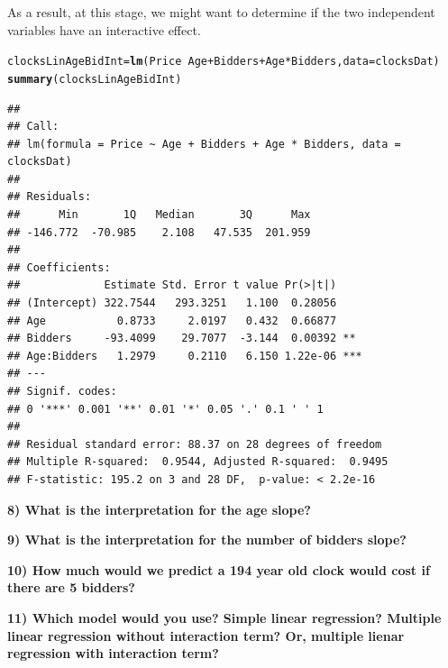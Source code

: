 \documentclass{article}\usepackage[]{graphicx}\usepackage[]{color}
\makeatletter
\newcommand{\hlopt}[1]{\textcolor[rgb]{0,0,0}{#1}}%
\newcommand{\hlstd}[1]{\textcolor[rgb]{0.345,0.345,0.345}{#1}}%
\newcommand{\hlkwb}[1]{\textcolor[rgb]{0.69,0.353,0.396}{#1}}%
\newcommand{\hlkwc}[1]{\textcolor[rgb]{0.333,0.667,0.333}{#1}}%
\newcommand{\hlkwd}[1]{\textcolor[rgb]{0.737,0.353,0.396}{\textbf{#1}}}%
\newenvironment{kframe}{%
 \def\at@end@of@kframe{}%
 \ifinner\ifhmode%
  \def\at@end@of@kframe{\end{minipage}}%
  \begin{minipage}{\columnwidth}%
 \fi\fi%
 \def\FrameCommand##1{\hskip\@totalleftmargin \hskip-\fboxsep
 \colorbox{shadecolor}{##1}\hskip-\fboxsep
     \hskip-\linewidth \hskip-\@totalleftmargin \hskip\columnwidth}%
 \MakeFramed {\advance\hsize-\width
   \@totalleftmargin\z@ \linewidth\hsize
   \@setminipage}}%
 {\par\unskip\endMakeFramed%
 \at@end@of@kframe}
\newenvironment{knitrout}{}{} %
\makeatother
\begin{document}
\vspace{5mm}

\noindent As a result, at this stage, we might want to determine if the two independent variables have an interactive effect.

\begin{knitrout}
\color{fgcolor}\begin{kframe}
\begin{alltt}
\hlstd{clocksLinAgeBidInt} \hlkwb{=} \hlkwd{lm}\hlstd{(Price} \hlopt{~} \hlstd{Age} \hlopt{+} \hlstd{Bidders} \hlopt{+} \hlstd{Age}\hlopt{*}\hlstd{Bidders,} \hlkwc{data}\hlstd{=clocksDat)}
\hlkwd{summary}\hlstd{(clocksLinAgeBidInt)}
\end{alltt}
\begin{verbatim}
## 
## Call:
## lm(formula = Price ~ Age + Bidders + Age * Bidders, data = clocksDat)
## 
## Residuals:
##      Min       1Q   Median       3Q      Max 
## -146.772  -70.985    2.108   47.535  201.959 
## 
## Coefficients:
##             Estimate Std. Error t value Pr(>|t|)    
## (Intercept) 322.7544   293.3251   1.100  0.28056    
## Age           0.8733     2.0197   0.432  0.66877    
## Bidders     -93.4099    29.7077  -3.144  0.00392 ** 
## Age:Bidders   1.2979     0.2110   6.150 1.22e-06 ***
## ---
## Signif. codes:  
## 0 '***' 0.001 '**' 0.01 '*' 0.05 '.' 0.1 ' ' 1
## 
## Residual standard error: 88.37 on 28 degrees of freedom
## Multiple R-squared:  0.9544,	Adjusted R-squared:  0.9495 
## F-statistic: 195.2 on 3 and 28 DF,  p-value: < 2.2e-16
\end{verbatim}
\end{kframe}
\end{knitrout}

\vspace{5mm}

\textbf{8) What is the interpretation for the age slope?}

\vspace{20mm}

\textbf{9) What is the interpretation for the number of bidders slope?}

\vspace{20mm}

\textbf{10) How much would we predict a 194 year old clock would cost if there are 5 bidders?}

\vspace{20mm}

\textbf{11) Which model would you use? Simple linear regression? Multiple linear regression without interaction term? Or, multiple lienar regression with interaction term?}
\end{document}
